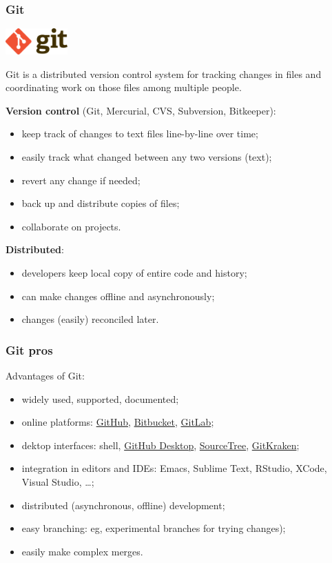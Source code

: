 \documentclass[10pt,svgnames,handout]{beamer}
\begin{document}
\begin{frame}
\frametitle{Git}
\includegraphics[height=1cm]{Git-logo}

Git is a distributed version control system for tracking changes in files and coordinating work on those files among multiple people.
\smallskip
\pause

\textbf{Version control} (Git, Mercurial, CVS, Subversion, Bitkeeper):
\begin{itemize}
   \item keep track of changes to text files line-by-line over time;
   \item easily track what changed between any two versions (text);
   \item revert any change if needed;
   \item back up and distribute copies of files;
   \item collaborate on projects.
 \end{itemize} 
\pause
\textbf{Distributed}:
\begin{itemize}
  \item developers keep local copy of entire code and history;
  \item can make changes offline and asynchronously;
  \item changes (easily) reconciled later.
\end{itemize}
\end{frame}


\begin{frame}
\frametitle{Git pros}

Advantages of Git:
\begin{itemize}
  \item widely used, supported, documented;
  \item online platforms: \href{https://github.com/}{GitHub}, \href{https://bitbucket.org/}{Bitbucket}, \href{https://about.gitlab.com/}{GitLab};
  \item dektop interfaces: shell, \href{https://desktop.github.com/}{GitHub Desktop}, \href{https://www.sourcetreeapp.com/}{SourceTree}, \href{https://www.gitkraken.com/}{GitKraken};
  \item integration in editors and IDEs: Emacs, Sublime Text, RStudio, XCode, Visual Studio, \ldots;
  \item distributed (asynchronous, offline) development;
  \item easy branching: eg, experimental branches for trying changes);
  \item easily make complex merges.
\end{itemize}
\end{frame}
\end{document}
